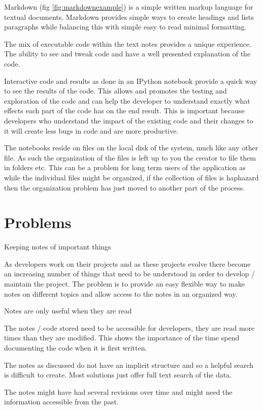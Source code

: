 Markdown (fig \ref{fig:markdownexample}) is a simple written markup language for
textual documents. Markdown provides simple ways to create headings and lists
paragraphs while balancing this with simple easy to read minimal formatting.

The mix of executable code within the text notes provides a unique
experience. The ability to see and tweak code and have a well
presented explanation of the code.

Interactive code and results as done in an IPython notebook provide a
quick way to see the results of the code. This allows and promotes the
testing and exploration of the code and can help the developer to
understand exactly what effects each part of the code has on the end
result. This is important because developers who understand the impact of the existing code and their changes to it will create less bugs in code and are more productive.

The notebooks reside on files on the local disk of the system, much like
any other file. As such the organization of the files is left up to you
the creator to file them in folders etc. This can be a problem for long term users of the application as while the individual files might be organized, if the collection of files is haphazard then the organization problem has just moved to another part of the process.

\section{Problems}\label{problems}

\begin{problem}{Keeping notes of important things}

As developers work on their projects and as these projects evolve there
become an increasing number of things that need to be understood in
order to develop / maintain the project. The problem is to provide an
easy flexible way to make notes on different topics and allow access to
the notes in an organized way.

\end{problem}

\begin{problem}{Notes are only useful when they are read}

The notes / code stored need to be accessible for developers, they are read more times than they are modified. This shows the importance of the time spend documenting the code when it is first written.

The notes as discussed do not have an implicit structure and so a helpful
search is difficult to create. Most solutions just offer full text
search of the data.

The notes might have had several revisions over time and might need the
information accessible from the past.

\end{problem}


